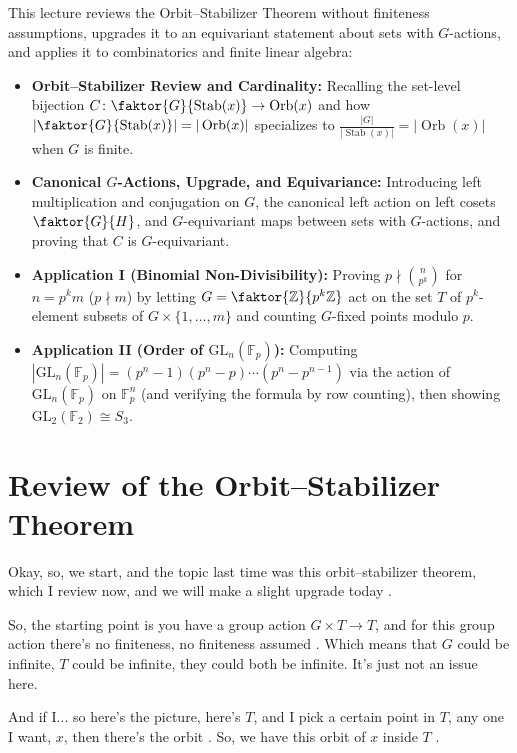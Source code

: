\begin{overview}
This lecture reviews the Orbit--Stabilizer Theorem without finiteness assumptions, upgrades it to an equivariant statement about sets with $G$-actions, and applies it to combinatorics and finite linear algebra:
\begin{itemize}
    \item \textbf{Orbit--Stabilizer Review and Cardinality:} Recalling the set-level bijection $C \colon \faktor{G}{\operatorname{Stab}(x)} \to \operatorname{Orb}(x)$ and how $\left|\faktor{G}{\operatorname{Stab}(x)}\right| = |\operatorname{Orb}(x)|$ specializes to $\frac{|G|}{|\operatorname{Stab}(x)|} = |\operatorname{Orb}(x)|$ when $G$ is finite.
    \item \textbf{Canonical $G$-Actions, Upgrade, and Equivariance:} Introducing left multiplication and conjugation on $G$, the canonical left action on left cosets $\faktor{G}{H}$, and $G$-equivariant maps between sets with $G$-actions, and proving that $C$ is $G$-equivariant.
    \item \textbf{Application I (Binomial Non-Divisibility):} Proving $p \nmid \binom{n}{p^k}$ for $n = p^k m$ ($p \nmid m$) by letting $G = \faktor{\mathbb{Z}}{p^k\mathbb{Z}}$ act on the set $T$ of $p^k$-element subsets of $G \times \{1, \dots, m\}$ and counting $G$-fixed points modulo $p$.
    \item \textbf{Application II (Order of $\mathrm{GL}_n(\mathbb{F}_p)$):} Computing $\left|\mathrm{GL}_n(\mathbb{F}_p)\right| = (p^n - 1)(p^n - p)\cdots(p^n - p^{n-1})$ via the action of $\mathrm{GL}_n(\mathbb{F}_p)$ on $\mathbb{F}_p^n$ (and verifying the formula by row counting), then showing $\mathrm{GL}_2(\mathbb{F}_2) \cong S_3$.
\end{itemize}
\end{overview}

\section{Review of the Orbit--Stabilizer Theorem}

\begin{speech}[00:00:00 - 00:00:58]
Okay, so, we start, and the topic last time was this orbit--stabilizer theorem, which I review now, and we will make a slight upgrade today .

So, the starting point is you have a group action $G \times T \to T$, and for this group action there's no finiteness, no finiteness assumed . Which means that $G$ could be infinite, $T$ could be infinite, they could both be infinite. It's just not an issue here.

And if I... so here's the picture, here's $T$, and I pick a certain point in $T$, any one I want, $x$, then there's the orbit . So, we have this orbit of $x$ inside $T$ .
\end{speech}

